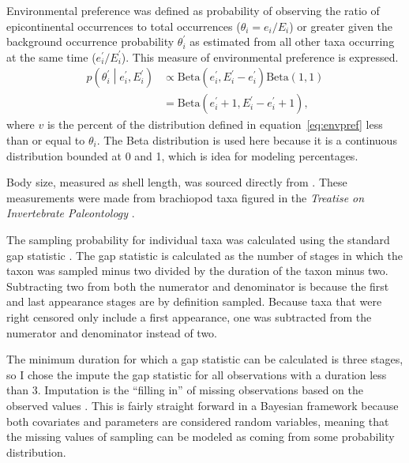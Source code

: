 \documentclass[11pt]{article}
\begin{document}
Environmental preference was defined as probability of observing the ratio of epicontinental occurrences to total occurrences (\(\theta_{i} = e_{i} / E_{i}\)) or greater given the background occurrence probability \(\theta^{\prime}_{i}\) as estimated from all other taxa occurring at the same time (\(e^{\prime}_{i} / E^{\prime}_{i}\)). This measure of environmental preference is expressed.
\begin{equation}
  \begin{aligned}
    p\left(\theta^{\prime}_{i} \middle| e^{\prime}_{i}, E^{\prime}_{i} \right) &\propto \mathrm{Beta}(e^{\prime}_{i}, E^{\prime}_{i} - e^{\prime}_{i}) \mathrm{Beta}(1, 1) \\
    &= \mathrm{Beta}(e^{\prime}_{i} + 1, E^{\prime}_{i} - e^{\prime}_{i} + 1),
  \end{aligned}
  \label{eq:envpref}
\end{equation}
where \(v\) is the percent of the distribution defined in equation~\ref{eq:envpref} less than or equal to \(\theta_{i}\). The Beta distribution is used here because it is a continuous distribution bounded at 0 and 1, which is idea for modeling percentages.

Body size, measured as shell length, was sourced directly from \citet{Payne2014}. These measurements were made from brachiopod taxa figured in the \textit{Treatise on Invertebrate Paleontology} \citep{Brunton2007}.

The sampling probability for individual taxa was calculated using the standard gap statistic \citep{Foote1996e,Foote2000}. The gap statistic is calculated as the number of stages in which the taxon was sampled minus two divided by the duration of the taxon minus two. Subtracting two from both the numerator and denominator is because the first and last appearance stages are by definition sampled. Because taxa that were right censored only include a first appearance, one was subtracted from the numerator and denominator instead of two.

The minimum duration for which a gap statistic can be calculated is three stages, so I chose the impute the gap statistic for all observations with a duration less than 3. Imputation is the ``filling in'' of missing observations based on the observed values \citep{Rubin1996,Gelman2007}. This is fairly straight forward in a Bayesian framework because both covariates and parameters are considered random variables, meaning that the missing values of sampling can be modeled as coming from some probability distribution. 
\end{document}
